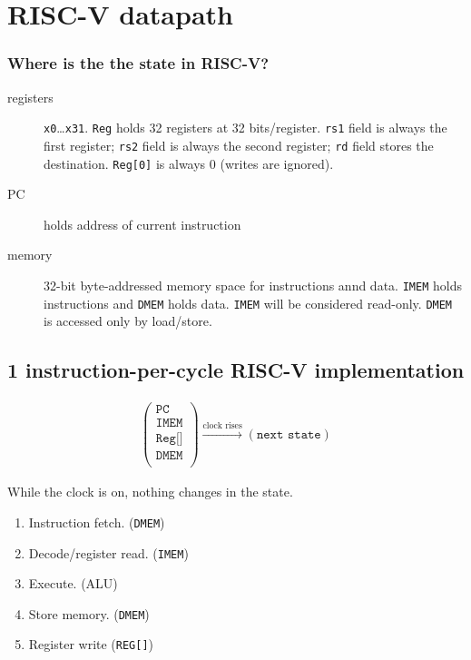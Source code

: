 \chapter{RISC-V datapath}
\subsection{Where is the the state in RISC-V?}
\begin{description}
	\item[registers] \texttt{x0}\ldots\texttt{x31}.
		\texttt{Reg} holds 32 registers at 32 bits/register.
		\texttt{rs1} field is always the first register;
		\texttt{rs2} field is always the second register;
		\texttt{rd} field stores the destination.
		\texttt{Reg[0]} is always 0 (writes are ignored).
	
	\item[PC] holds address of current instruction
	
	\item[memory] 32-bit byte-addressed memory space for instructions annd data.
		\texttt{IMEM} holds instructions and \texttt{DMEM} holds data. 
		\texttt{IMEM} will be considered read-only. \texttt{DMEM} is accessed only by load/store.
\end{description}

\section{1 instruction-per-cycle RISC-V implementation}
\begin{align*}
\begin{pmatrix}
\texttt{PC} \\
\texttt{IMEM} \\
\texttt{Reg[]}\\ 
\texttt{DMEM}\\
\end{pmatrix}
\xrightarrow{\text{clock rises}}{}
\left(\texttt{next state}\right)
\end{align*}

While the clock is on, nothing changes in the state.

\begin{enumerate}
	\item Instruction fetch. (\texttt{DMEM})
	\item Decode/register read. (\texttt{IMEM})
	\item Execute. (ALU)
	\item Store memory. (\texttt{DMEM})
	\item Register write (\texttt{REG[]})
\end{enumerate}

